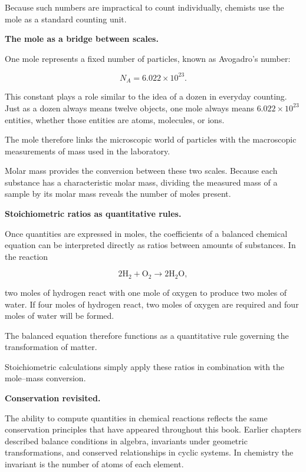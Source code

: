 \documentclass[11pt, openany]{book}
\theoremstyle{plain}
\theoremstyle{definition}
\theoremstyle{remark}
\begin{document}
Because such numbers are impractical to count individually, chemists
use the mole as a standard counting unit.

\medskip

\textbf{The mole as a bridge between scales.}

One mole represents a fixed number of particles, known as Avogadro's
number:

\[
N_A = 6.022 \times 10^{23}.
\]

This constant plays a role similar to the idea of a dozen in everyday
counting. Just as a dozen always means twelve objects, one mole always
means $6.022\times10^{23}$ entities, whether those entities are atoms,
molecules, or ions.

The mole therefore links the microscopic world of particles with the
macroscopic measurements of mass used in the laboratory.

Molar mass provides the conversion between these two scales. Because
each substance has a characteristic molar mass, dividing the measured
mass of a sample by its molar mass reveals the number of moles present.

\medskip

\textbf{Stoichiometric ratios as quantitative rules.}

Once quantities are expressed in moles, the coefficients of a balanced
chemical equation can be interpreted directly as ratios between amounts
of substances. In the reaction

\[
2\mathrm{H_2}+ \mathrm{O_2} \rightarrow 2\mathrm{H_2O},
\]

two moles of hydrogen react with one mole of oxygen to produce two
moles of water. If four moles of hydrogen react, two moles of oxygen
are required and four moles of water will be formed.

The balanced equation therefore functions as a quantitative rule
governing the transformation of matter.

Stoichiometric calculations simply apply these ratios in combination
with the mole–mass conversion.

\medskip

\textbf{Conservation revisited.}

The ability to compute quantities in chemical reactions reflects the
same conservation principles that have appeared throughout this book.
Earlier chapters described balance conditions in algebra, invariants
under geometric transformations, and conserved relationships in cyclic
systems. In chemistry the invariant is the number of atoms of each
element.
\end{document}
